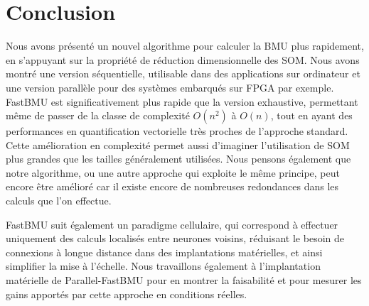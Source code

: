 	\section{Conclusion}

	Nous avons présenté un nouvel algorithme pour calculer la BMU plus rapidement, en s'appuyant sur la propriété de réduction dimensionnelle des SOM. Nous avons montré une version séquentielle, utilisable dans des applications sur ordinateur et une version parallèle pour des systèmes embarqués sur FPGA par exemple. FastBMU est significativement plus rapide que la version exhaustive, permettant même de passer de la classe de complexité $O(n^2)$ à $O(n)$, tout en ayant des performances en quantification vectorielle très proches de l'approche standard. Cette amélioration en complexité permet aussi d'imaginer l'utilisation de SOM plus grandes que les tailles généralement utilisées. Nous pensons également que notre algorithme, ou une autre approche qui exploite le même principe, peut encore être amélioré car il existe encore de nombreuses redondances dans les calculs que l'on effectue.

	FastBMU suit également un paradigme cellulaire, qui correspond à effectuer uniquement des calculs localisés entre neurones voisins, réduisant le besoin de connexions à longue distance dans des implantations matérielles, et ainsi simplifier la mise à l'échelle. Nous travaillons également à l'implantation matérielle de Parallel-FastBMU pour en montrer la faisabilité et pour mesurer les gains apportés par cette approche en conditions réelles.
		

